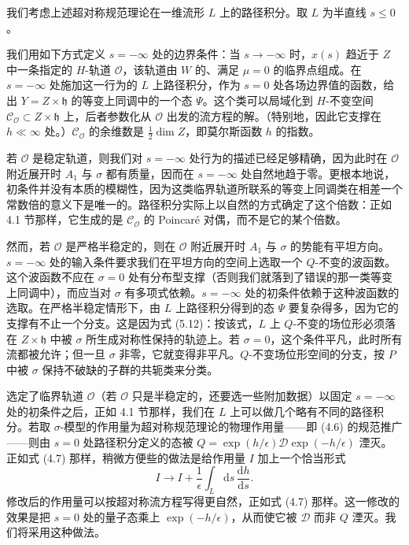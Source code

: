 \documentclass[11pt,a4paper,UTF8]{ctexart}
\theoremstyle{plain}
\theoremstyle{definition}
\begin{document}
我们考虑上述超对称规范理论在一维流形 $L$ 上的路径积分。取 $L$ 为半直线 $s\le0$。

我们用如下方式定义 $s=-\infty$ 处的边界条件：当 $s\to-\infty$ 时，$x(s)$ 趋近于 $Z$ 中一条指定的 $H$-轨道 $\mathcal O$，该轨道由 $W$ 的、满足 $\mu=0$ 的临界点组成。在 $s=-\infty$ 处施加这一行为的 $L$ 上路径积分，作为 $s=0$ 处各场边界值的函数，给出 $Y=Z\times\mathfrak h$ 的等变上同调中的一个态 $\Psi$。这个类可以局域化到 $H$-不变空间 $\mathcal C_{\mathcal O}\subset Z\times\mathfrak h$ 上，后者参数化从 $\mathcal O$ 出发的流方程的解。（特别地，因此它支撑在 $h\ll\infty$ 处。）$\mathcal C_{\mathcal O}$ 的余维数是 $\frac12\dim Z$，即莫尔斯函数 $h$ 的指数。

若 $\mathcal O$ 是稳定轨道，则我们对 $s=-\infty$ 处行为的描述已经足够精确，因为此时在 $\mathcal O$ 附近展开时 $A_1$ 与 $\sigma$ 都有质量，因而在 $s=-\infty$ 处自然地趋于零。更根本地说，初条件并没有本质的模糊性，因为这类临界轨道所联系的等变上同调类在相差一个常数倍的意义下是唯一的。路径积分实际上以自然的方式确定了这个倍数：正如 4.1 节那样，它生成的是 $\mathcal C_{\mathcal O}$ 的 Poincaré 对偶，而不是它的某个倍数。


然而，若 $\mathcal O$ 是严格半稳定的，则在 $\mathcal O$ 附近展开时 $A_1$ 与 $\sigma$ 的势能有平坦方向。$s=-\infty$ 处的输入条件要求我们在平坦方向的空间上选取一个 $Q$-不变的波函数。这个波函数不应在 $\sigma=0$ 处有分布型支撑（否则我们就落到了错误的那一类等变上同调中），而应当对 $\sigma$ 有多项式依赖。$s=-\infty$ 处的初条件依赖于这种波函数的选取。在严格半稳定情形下，由 $L$ 上路径积分得到的态 $\Psi$ 要复杂得多，因为它的支撑有不止一个分支。这是因为式 (5.12)：按该式，$L$ 上 $Q$-不变的场位形必须落在 $Z\times\mathfrak h$ 中被 $\sigma$ 所生成对称性保持的轨迹上。若 $\sigma=0$，这个条件平凡，此时所有流都被允许；但一旦 $\sigma$ 非零，它就变得非平凡。$Q$-不变场位形空间的分支，按 $P$ 中被 $\sigma$ 保持不破缺的子群的共轭类来分类。

选定了临界轨道 $\mathcal O$（若 $\mathcal O$ 只是半稳定的，还要选一些附加数据）以固定 $s=-\infty$ 处的初条件之后，正如 4.1 节那样，我们在 $L$ 上可以做几个略有不同的路径积分。若取 $\sigma$-模型的作用量为超对称规范理论的物理作用量——即 (4.6) 的规范推广——则由 $s=0$ 处路径积分定义的态被 $Q=\exp(h/\epsilon)\mathcal D\exp(-h/\epsilon)$ 湮灭。正如式 (4.7) 那样，稍微方便些的做法是给作用量 $I$ 加上一个恰当形式
\begin{equation}
    I\to I+\frac{1}{\epsilon}\int_L\mathrm ds\,\frac{\mathrm dh}{\mathrm ds}.
    \tag{5.29}
\end{equation}
修改后的作用量可以按超对称流方程写得更自然，正如式 (4.7) 那样。这一修改的效果是把 $s=0$ 处的量子态乘上 $\exp(-h/\epsilon)$，从而使它被 $\mathcal D$ 而非 $Q$ 湮灭。我们将采用这种做法。
\end{document}
